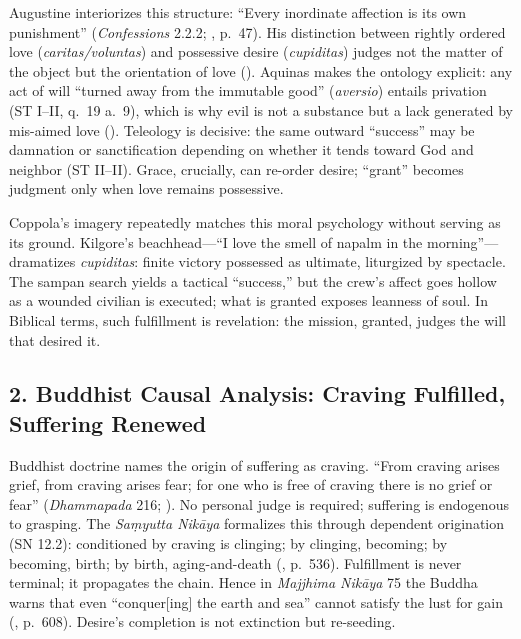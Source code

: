 \documentclass[12pt]{article}
\begin{document}
Augustine interiorizes this structure: ``Every inordinate affection is its own punishment'' (\emph{Confessions} 2.2.2; \parencite{AugustineConfessions1998}, p.~47). His distinction between rightly ordered love (\emph{caritas/voluntas}) and possessive desire (\emph{cupiditas}) judges not the matter of the object but the orientation of love (\parencite{AugustineCity2003}). Aquinas makes the ontology explicit: any act of will ``turned away from the immutable good'' (\emph{aversio}) entails privation (ST I--II, q.~19 a.~9), which is why evil is not a substance but a lack generated by mis-aimed love (\parencite{AquinasST1947}). Teleology is decisive: the same outward ``success'' may be damnation or sanctification depending on whether it tends toward God and neighbor (ST II--II). Grace, crucially, can re-order desire; ``grant'' becomes judgment only when love remains possessive.

Coppola’s imagery repeatedly matches this moral psychology without serving as its ground. Kilgore’s beachhead---``I love the smell of napalm in the morning''---dramatizes \emph{cupiditas}: finite victory possessed as ultimate, liturgized by spectacle. The sampan search yields a tactical ``success,'' but the crew’s affect goes hollow as a wounded civilian is executed; what is granted exposes leanness of soul. In Biblical terms, such fulfillment is revelation: the mission, granted, judges the will that desired it.

\subsection*{2. Buddhist Causal Analysis: Craving Fulfilled, Suffering Renewed}

Buddhist doctrine names the origin of suffering as craving. ``From craving arises grief, from craving arises fear; for one who is free of craving there is no grief or fear'' (\emph{Dhammapada} 216; \parencite{BuddharakkhitaDhp1993}). No personal judge is required; suffering is endogenous to grasping. The \emph{Saṃyutta Nikāya} formalizes this through dependent origination (SN 12.2): conditioned by craving is clinging; by clinging, becoming; by becoming, birth; by birth, aging-and-death (\parencite{BodhiSN2000}, p.~536). Fulfillment is never terminal; it propagates the chain. Hence in \emph{Majjhima Nikāya} 75 the Buddha warns that even ``conquer[ing] the earth and sea'' cannot satisfy the lust for gain (\parencite{NanamoliBodhiMN1995}, p.~608). Desire’s completion is not extinction but re-seeding.
\end{document}
